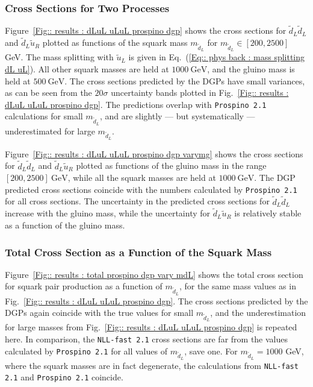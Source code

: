 \documentclass[twoside,english]{uiofysmaster}
\begin{document}
{{\subsubsection{Cross Sections for Two Processes}
Figure~\ref{Fig:: results : dLuL uLuL prospino dgp} shows the cross sections for $\widetilde{d}_L \widetilde{d}_L$ and $\widetilde{d}_L \widetilde{u}_R$ plotted as functions of the squark mass $m_{\widetilde{d}_L}$ for $m_{\widetilde{d}_L}\in[200, 2500]$ GeV. The mass splitting with $\widetilde{u}_L$ is given in Eq.~(\ref{Eq:: phys back : mass splitting dL uL}). All other squark masses are held at $1000~\mathrm{GeV}$, and the gluino mass is held at $500~\mathrm{GeV}$. The cross sections predicted by the DGPs have small variances, as can be seen from the $20 \sigma$ uncertainty bands plotted in Fig.~\ref{Fig:: results : dLuL uLuL prospino dgp}. The predictions overlap with \verb|Prospino 2.1| calculations for small $m_{\widetilde{d}_L}$, and are slightly --- but systematically --- underestimated for large $m_{\widetilde{d}_L}$. 

Figure~\ref{Fig:: results : dLuL uLuL prospino dgp varymg} shows the cross sections for $\widetilde{d}_L \widetilde{d}_L$ and $\widetilde{d}_L \widetilde{u}_R$ plotted as functions of the gluino mass in the range $[200, 2500]~\mathrm{GeV}$, while all the squark masses are held at $1000~\mathrm{GeV}$. The DGP predicted cross sections coincide with the numbers calculated by \verb|Prospino 2.1| for all cross sections. The uncertainty in the predicted cross sections for $\widetilde{d}_L \widetilde{d}_L$ increase with the gluino mass, while the uncertainty for $\widetilde{d}_L \widetilde{u}_R$ is relatively stable as a function of the gluino mass.  

\subsubsection{Total Cross Section as a Function of the Squark Mass}

Figure~\ref{Fig:: results : total prospino dgp vary mdL} shows the total cross section for squark pair production as a function of $m_{\widetilde{d}_L}$, for the same mass values as in Fig.~\ref{Fig:: results : dLuL uLuL prospino dgp}. The cross sections predicted by the DGPs again coincide with the true values for small $m_{\widetilde{d}_L}$, and the underestimation for large masses from Fig.~\ref{Fig:: results : dLuL uLuL prospino dgp} is repeated here. In comparison, the \verb|NLL-fast 2.1| cross sections are far from the values calculated by \verb|Prospino 2.1| for all values of $m_{\widetilde{d}_L}$, save one. For $m_{\widetilde{d}_L}=1000$ GeV, where the squark masses are in fact degenerate, the calculations from \verb|NLL-fast 2.1| and \verb|Prospino 2.1| coincide.  

}}
\end{document}
